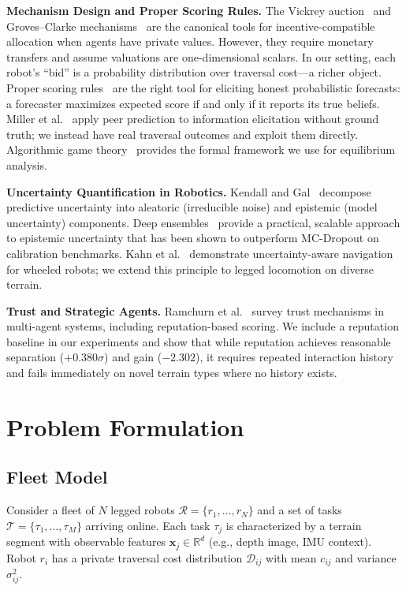\documentclass[letterpaper, 10pt, conference]{ieeeconf}
\begin{document}
\textbf{Mechanism Design and Proper Scoring Rules.}
The Vickrey auction~\cite{vickrey1961counterspeculation} and
Groves--Clarke mechanisms~\cite{groves1973incentives} are the canonical
tools for incentive-compatible allocation when agents have private values.
However, they require monetary transfers and assume valuations are
one-dimensional scalars.  In our setting, each robot's ``bid'' is a
probability distribution over traversal cost---a richer object.  Proper
scoring rules~\cite{gneiting2007strictly} are the right tool for eliciting
honest probabilistic forecasts: a forecaster maximizes expected score if and
only if it reports its true beliefs.  Miller et al.~\cite{miller2005eliciting}
apply peer prediction to information elicitation without ground truth;
we instead have real traversal outcomes and exploit them directly.
Algorithmic game theory~\cite{nisan2007algorithmic} provides the formal
framework we use for equilibrium analysis.

\textbf{Uncertainty Quantification in Robotics.}
Kendall and Gal~\cite{kendall2017uncertainties} decompose predictive
uncertainty into aleatoric (irreducible noise) and epistemic (model
uncertainty) components.  Deep ensembles~\cite{lakshminarayanan2017simple}
provide a practical, scalable approach to epistemic uncertainty that has been
shown to outperform MC-Dropout on calibration benchmarks.  Kahn et
al.~\cite{kahn2017uncertainty} demonstrate uncertainty-aware navigation for
wheeled robots; we extend this principle to legged locomotion on diverse
terrain.

\textbf{Trust and Strategic Agents.}
Ramchurn et al.~\cite{ramchurn2009trust} survey trust mechanisms in
multi-agent systems, including reputation-based scoring.  We include a
reputation baseline in our experiments and show that while reputation achieves
reasonable separation ($+0.380\sigma$) and gain ($-2.302$), it requires
repeated interaction history and fails immediately on novel terrain types where
no history exists.

\section{Problem Formulation}
\label{sec:problem}

\subsection{Fleet Model}
Consider a fleet of $N$ legged robots $\mathcal{R} = \{r_1, \ldots, r_N\}$
and a set of tasks $\mathcal{T} = \{\tau_1, \ldots, \tau_M\}$ arriving
online.  Each task $\tau_j$ is characterized by a terrain segment with
observable features $\mathbf{x}_j \in \mathbb{R}^d$ (e.g., depth image,
IMU context).  Robot $r_i$ has a private traversal cost distribution
$\mathcal{D}_{ij}$ with mean $c_{ij}$ and variance $\sigma^2_{ij}$.
\end{document}
